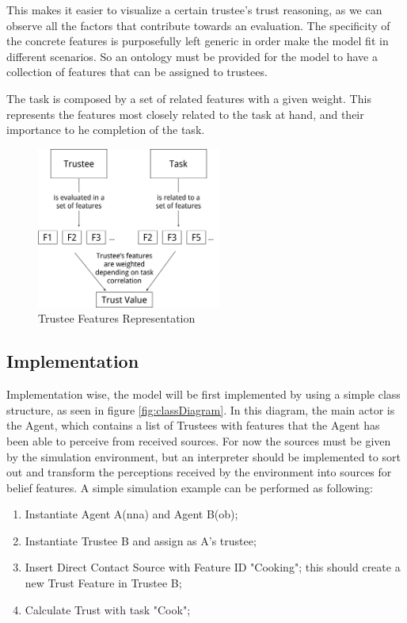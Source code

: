 This makes it easier to visualize a certain trustee's trust reasoning, as we can observe all the factors that contribute towards an evaluation. The specificity of the concrete features is purposefully left generic in order make the model fit in different scenarios. So an ontology must be provided for the model to have a collection of features that can be assigned to trustees.



The task is composed by a set of related features with a given weight. This represents the features most closely related to the task at hand, and their importance to he completion of the task.


\begin{figure}[hbt]
	\centering
	\includegraphics[height=200px]{figures/Trust_Model_Diagram.png}
	\caption{Trustee Features Representation}
	\label{fig:trustee}
\end{figure}


\subsection{Implementation}

Implementation wise, the model will be first implemented by using a simple class structure, as seen in figure \ref{fig:classDiagram}. In this diagram, the main actor is the Agent, which contains a list of Trustees with features that the Agent has been able to perceive from received sources. For now the sources must be given by the simulation environment, but an interpreter should be implemented to sort out and transform the perceptions received by the environment into sources for belief features.
A simple simulation example can be performed as following:
\begin{enumerate}
	\item Instantiate Agent A(nna) and Agent B(ob);
	\item Instantiate Trustee B and assign as A's trustee;
	\item Insert Direct Contact Source with Feature ID "Cooking"; this should create a new Trust Feature in Trustee B;
	\item Calculate Trust with task "Cook";
\end{enumerate}

